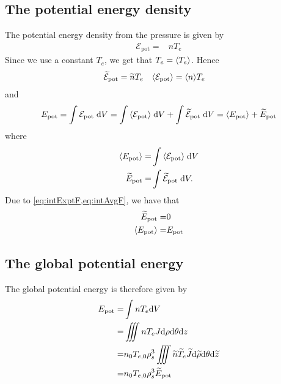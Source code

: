 \subsection{The potential energy density}
The potential energy density from the pressure is given by%
%
\begin{align*}
    \mathcal{E}_{\text{pot}} =& nT_e
\end{align*}
%
Since we use a constant $T_e$, we get that $T_e=\langle{T_e}\rangle$.
Hence
%
\begin{align*}
    &\widetilde{ \mathcal{E}}_{\text{pot}} = \widetilde{ n}T_e&
    &\langle{\mathcal{E}_{\text{pot}}}\rangle = \langle{n}\rangle T_e&
\end{align*}
%
and
%
\begin{align*}
    E_{\text{pot}}
    = \int {\mathcal{E}_{\text{pot}}} \; \text{d} {V}
    = \int {\langle{\mathcal{E}_{\text{pot}}}\rangle} \; \text{d} {V} + \int {\widetilde{ \mathcal{E}}_{\text{pot}}} \; \text{d} {V}
    = \langle{E_{\text{pot}}}\rangle + \widetilde{ E}_{\text{pot}}
\end{align*}
%
where
%
\begin{align*}
    \langle{E_{\text{pot}}}\rangle =& \int {\langle{\mathcal{E}_{\text{pot}}}\rangle} \; \text{d} {V}\\
    \widetilde{ E}_{\text{pot}} =& \int {\widetilde{ \mathcal{E}}_{\text{pot}}} \; \text{d} {V}.
\end{align*}
%
Due to \cref{eq:intExptF,eq:intAvgF}, we have that
%
\begin{align*}
    \widetilde{ E}_{\text{pot}} =& 0\\
    \langle{E_{\text{pot}}}\rangle =& E_{\text{pot}}
\end{align*}

\subsection{The global potential energy}
%
The global potential energy is therefore given by
%
\begin{align*}
    E_{\text{pot}}
    =& \int nT_e \text{d} V
    \\
    =& \iiint nT_e J \text{d}\rho \text{d}\theta \text{d} z
    \\
    =& n_0T_{e,0}\rho_s^3\iiint \widetilde{ n}\widetilde{ T}_e \widetilde{ J} \text{d}\widetilde{ \rho} \text{d}\theta \text{d} \widetilde{ z}
    \\
    =& n_0T_{e,0}\rho_s^3\widetilde{ E}_{\text{pot}}
\end{align*}

